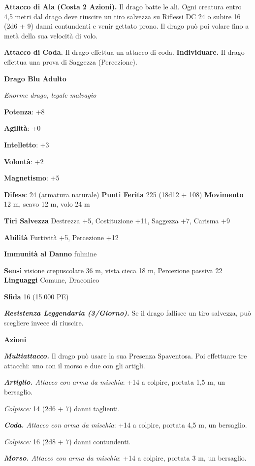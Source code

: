 \begin{multicols}{2}
\textbf{Attacco di Ala (Costa 2 Azioni).} Il drago batte le ali. Ogni
creatura entro 4,5 metri dal drago deve riuscire un tiro salvezza su Riflessi DC 24 o subire 16 (2d6 + 9) danni contundenti e venir gettato
prono. Il drago può poi volare fino a metà della sua velocità di volo.

\textbf{Attacco di Coda.} Il drago effettua un attacco di coda.
\textbf{Individuare.} Il drago effettua una prova di Saggezza
(Percezione).

\textbf{Drago Blu Adulto}

\emph{Enorme drago, legale malvagio}

\textbf{Potenza}: +8

\textbf{Agilità}: +0

\textbf{Intelletto}: +3

\textbf{Volontà}: +2

\textbf{Magnetismo}: +5

\textbf{Difesa}: 24 (armatura naturale) \textbf{Punti Ferita}
225 (18d12 + 108) \textbf{Movimento} 12 m, scavo 12 m, volo 24 m

\textbf{Tiri Salvezza} Destrezza +5, Costituzione +11, Saggezza +7,
Carisma +9

\textbf{Abilità} Furtività +5, Percezione +12

\textbf{Immunità al Danno} fulmine

\textbf{Sensi} visione crepuscolare 36 m, vista cieca 18 m, Percezione passiva
22 \textbf{Linguaggi} Comune, Draconico

\textbf{Sfida} 16 (15.000 PE)

\emph{\textbf{Resistenza Leggendaria (3/Giorno).}} Se il drago fallisce
un tiro salvezza, può scegliere invece di riuscire.

\textbf{Azioni}

\emph{\textbf{Multiattacco.}} Il drago può usare la sua Presenza
Spaventosa. Poi effettuare tre attacchi: uno con il morso e due con gli
artigli.

\emph{\textbf{Artiglio.} Attacco con arma da mischia}: +14 a colpire,
portata 1,5 m, un bersaglio.

\emph{Colpisce:} 14 (2d6 + 7) danni taglienti.

\emph{\textbf{Coda.} Attacco con arma da mischia}: +14 a colpire,
portata 4,5 m, un bersaglio.

\emph{Colpisce:} 16 (2d8 + 7) danni contundenti.

\emph{\textbf{Morso.} Attacco con arma da mischia}: +14 a colpire,
portata 3 m, un bersaglio.


\end{multicols}
